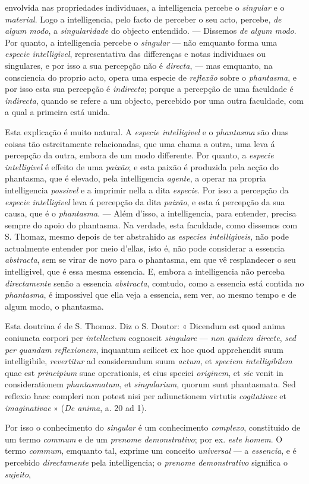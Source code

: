 envolvida nas propriedades individuaes, a intelligencia percebe o \emph{singular} e o \emph{material}. Logo a intelligencia, pelo facto de perceber o seu acto, percebe, \emph{de algum modo}, a \emph{singularidade} do objecto entendido. --- Dissemos \emph{de algum modo}. Por quanto, a intelligencia percebe o \emph{singular} --- não emquanto forma uma \emph{especie intelligivel}, representativa das differenças e notas individuaes ou singulares, e por isso a sua percepção não é \emph{directa}, --- mas emquanto, na consciencia do proprio acto, opera uma especie de \emph{reflexão} sobre o \emph{phantasma}, e por isso esta sua percepção é \emph{indirecta}; porque a percepção de uma faculdade é \emph{indirecta}, quando se refere a um objecto, percebido por uma outra faculdade, com a qual a primeira está unida.\par Esta explicação é muito natural. A \emph{especie intelligivel} e o \emph{phantasma} são duas coisas tão estreitamente relacionadas, que uma chama a outra, uma leva á percepção da outra, embora de um modo differente. Por quanto, a \emph{especie intelligivel} é effeito de uma \emph{paixão}; e esta paixão é produzida pela acção do phantasma, que é elevado, pela intelligencia \emph{agente}, a operar na propria intelligencia \emph{possivel} e a imprimir nella a dita \emph{especie}. Por isso a percepção da \emph{especie intelligivel} leva á percepção da dita \emph{paixão}, e esta á percepção da sua causa, que é o \emph{phantasma}. --- Além d'isso, a intelligencia, para entender, precisa sempre do apoio do phantasma. Na verdade, esta faculdade, como dissemos com S. Thomaz, mesmo depois de ter abstrahido as \emph{especies intelligiveis}, não pode actualmente entender por meio d'ellas, isto é, não pode considerar a essencia \emph{abstracta}, sem se virar de novo para o phantasma, em que vê resplandecer o seu intelligivel, que é essa mesma essencia. E, embora a intelligencia não perceba \emph{directamente} senão a essencia \emph{abstracta}, comtudo, como a essencia está contida no \emph{phantasma}, é impossivel que ella veja a essencia, sem ver, ao mesmo tempo e de algum modo, o phantasma.\par Esta doutrina é de S. Thomaz. Diz o S. Doutor: « Dicendum est quod anima coniuncta corpori per \emph{intellectum} cognoscit \emph{singulare} --- \emph{non quidem directe}, \emph{sed per quandam reflexionem}, inquantum scilicet ex hoc quod apprehendit suum intelligibile, \emph{revertitur} ad considerandum suum \emph{actum}, et \emph{speciem intelligibilem} quae est \emph{principium} suae operationis, et eius speciei \emph{originem}, et \emph{sic} venit in considerationem \emph{phantasmatum}, et \emph{singularium}, quorum sunt phantasmata. Sed reflexio haec compleri non potest nisi per adiunctionem virtutis \emph{cogitativae} et \emph{imaginativae} » (\emph{De anima}, a. 20 ad 1).\par Por isso o conhecimento do \emph{singular} é um conhecimento \emph{complexo}, constituido de um termo \emph{commum} e de um \emph{prenome demonstrativo}; por ex. \emph{este homem}. O termo \emph{commum}, emquanto tal, exprime um conceito \emph{universal} --- a \emph{essencia}, e é percebido \emph{directamente} pela intelligencia; o \emph{prenome demonstrativo} significa o \emph{sujeito}, 